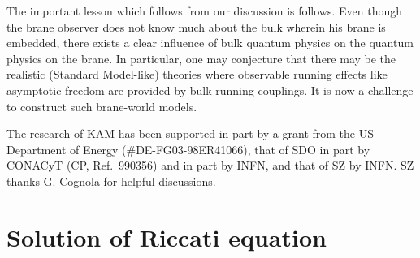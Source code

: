 \documentclass[a4paper,aps,prl,preprint,groupedaddress,showpacs,nobibnotes,tightenlines]{revtex4}
\begin{document}
The important lesson which follows from our discussion is follows.
Even though the brane observer does not know much about the bulk wherein his 
brane is embedded, there exists a clear influence of bulk quantum physics on
the quantum physics on the brane. In particular, one may conjecture that 
there may be
the realistic (Standard Model-like) theories where observable running effects
 like asymptotic freedom are provided by bulk running couplings.
It is now a challenge to construct such brane-world models.

\begin{acknowledgments}
The research of KAM has been supported in part by a grant from the US
Department of Energy (\#DE-FG03-98ER41066), that of
 SDO  in part by 
CONACyT (CP, Ref.~990356) and in part by INFN, and that of SZ by INFN.
SZ thanks G. Cognola for helpful discussions.
\end{acknowledgments}

\appendix
\section{Solution of Riccati equation}
\end{document}
